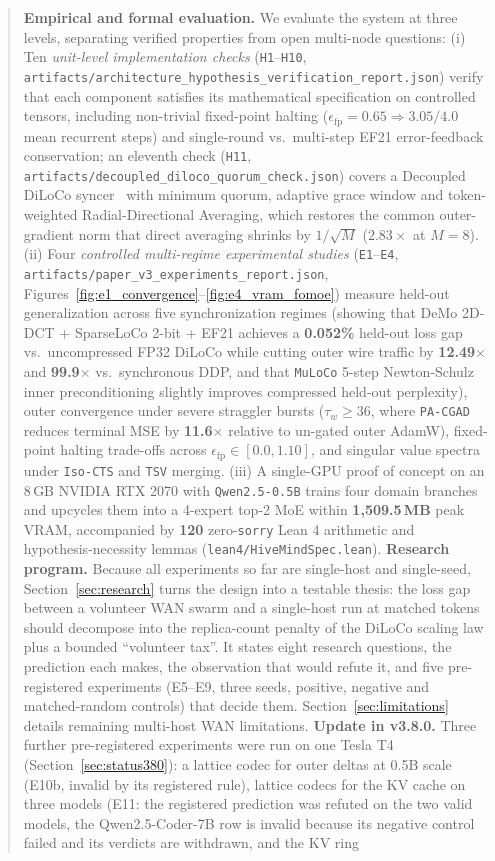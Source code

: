 \documentclass[11pt,a4paper]{article}
\begin{document}
\begin{abstract}
\textbf{Empirical and formal evaluation.} We evaluate the system at three levels, separating verified properties from open multi-node questions: (i) Ten \emph{unit-level implementation checks} (\texttt{H1}--\texttt{H10}, \texttt{artifacts/architecture\_hypothesis\_verification\_report.json}) verify that each component satisfies its mathematical specification on controlled tensors, including non-trivial fixed-point halting ($\epsilon_{\text{fp}} = 0.65 \Rightarrow 3.05/4.0$ mean recurrent steps) and single-round vs.\ multi-step EF21 error-feedback conservation; an eleventh check (\texttt{H11}, \texttt{artifacts/decoupled\_diloco\_quorum\_check.json}) covers a Decoupled DiLoCo syncer~\cite{douillard2026decoupled} with minimum quorum, adaptive grace window and token-weighted Radial-Directional Averaging, which restores the common outer-gradient norm that direct averaging shrinks by $1/\sqrt{M}$ ($2.83\times$ at $M=8$). (ii) Four \emph{controlled multi-regime experimental studies} (\texttt{E1}--\texttt{E4}, \texttt{artifacts/paper\_v3\_experiments\_report.json}, Figures~\ref{fig:e1_convergence}--\ref{fig:e4_vram_fomoe}) measure held-out generalization across five synchronization regimes (showing that DeMo 2D-DCT + SparseLoCo 2-bit + EF21 achieves a \textbf{0.052\%} held-out loss gap vs.\ uncompressed FP32 DiLoCo while cutting outer wire traffic by \textbf{12.49$\times$} and \textbf{99.9$\times$} vs.\ synchronous DDP, and that \texttt{MuLoCo} 5-step Newton-Schulz inner preconditioning slightly improves compressed held-out perplexity), outer convergence under severe straggler bursts ($\tau_w \ge 36$, where \texttt{PA-CGAD} reduces terminal MSE by \textbf{11.6$\times$} relative to un-gated outer AdamW), fixed-point halting trade-offs across $\epsilon_{\text{fp}} \in [0.0, 1.10]$, and singular value spectra under \texttt{Iso-CTS} and \texttt{TSV} merging. (iii) A single-GPU proof of concept on an 8\,GB NVIDIA RTX 2070 with \texttt{Qwen2.5-0.5B} trains four domain branches and upcycles them into a 4-expert top-2 MoE within \textbf{1{,}509.5\,MB} peak VRAM, accompanied by \textbf{120} zero-\texttt{sorry} Lean 4 arithmetic and hypothesis-necessity lemmas (\texttt{lean4/HiveMindSpec.lean}). \textbf{Research program.} Because all experiments so far are single-host and single-seed, Section~\ref{sec:research} turns the design into a testable thesis: the loss gap between a volunteer WAN swarm and a single-host run at matched tokens should decompose into the replica-count penalty of the DiLoCo scaling law plus a bounded ``volunteer tax''. It states eight research questions, the prediction each makes, the observation that would refute it, and five pre-registered experiments (E5--E9, three seeds, positive, negative and matched-random controls) that decide them. Section~\ref{sec:limitations} details remaining multi-host WAN limitations. \textbf{Update in v3.8.0.} Three further pre-registered experiments were run on one Tesla T4 (Section~\ref{sec:status380}): a lattice codec for outer deltas at 0.5B scale (E10b, invalid by its registered rule), lattice codecs for the KV cache on three models (E11: the registered prediction was refuted on the two valid models, the Qwen2.5-Coder-7B row is invalid because its negative control failed and its verdicts are withdrawn, and the KV ring 
\end{abstract}
\end{document}
